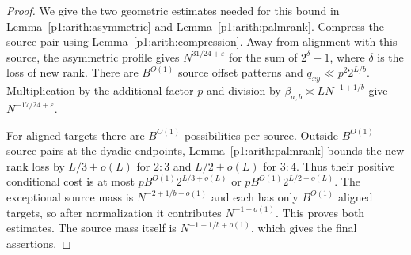 \begin{proof}
We give the two geometric estimates needed for this bound in
Lemma~\ref{p1:arith:asymmetric} and Lemma~\ref{p1:arith:palmrank}.
Compress the source pair using Lemma~\ref{p1:arith:compression}.
Away from alignment with this source, the asymmetric profile gives
$N^{31/24+\varepsilon}$ for the sum of $2^{\delta}-1$, where $\delta$ is
the loss of new rank.  There are $B^{O(1)}$ source offset patterns and
$q_{xy}\ll p^2 2^{L/b}$.  Multiplication by the additional factor $p$
and division by $\beta_{a,b}\asymp LN^{-1+1/b}$ give
$N^{-17/24+\varepsilon}$.

For aligned targets there are $B^{O(1)}$ possibilities per source.  Outside
$B^{O(1)}$ source pairs at the dyadic endpoints, Lemma~\ref{p1:arith:palmrank}
bounds the new rank loss by $L/3+o(L)$ for $2:3$ and $L/2+o(L)$ for $3:4$.
Thus their positive conditional cost is at most
$pB^{O(1)}2^{L/3+o(L)}$ or $pB^{O(1)}2^{L/2+o(L)}$.
The exceptional source mass is $N^{-2+1/b+o(1)}$ and each has only
$B^{O(1)}$ aligned targets, so after normalization it contributes
$N^{-1+o(1)}$.  This proves both estimates.  The source mass itself is
$N^{-1+1/b+o(1)}$, which gives the final assertions.
\end{proof}
